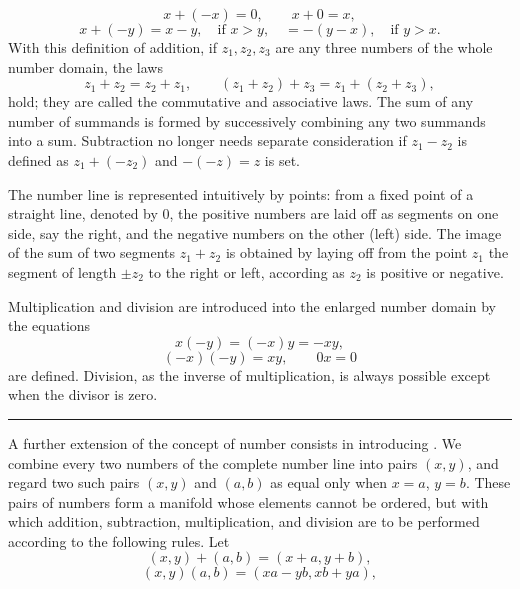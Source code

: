 \[
 x+(-x)=0,
 \qquad x+0=x,
\]
\[
 x+(-y)=x-y,\quad \text{if }x>y,
 \quad =-(y-x),\quad \text{if }y>x.
\]
With this definition of addition, if $z_1,z_2,z_3$ are any three
numbers of the whole number domain, the laws
\[
 z_1+z_2=z_2+z_1,
 \qquad (z_1+z_2)+z_3=z_1+(z_2+z_3),
\]
hold; they are called the commutative and associative laws. The sum of
any number of summands is formed by successively combining any two
summands into a sum. Subtraction no longer needs separate
consideration if $z_1-z_2$ is defined as $z_1+(-z_2)$ and
$-(-z)=z$ is set.

The number line is represented intuitively by points: from a fixed
point of a straight line, denoted by $0$, the positive numbers are laid
off as segments on one side, say the right, and the negative numbers
on the other (left) side. The image of the sum of two segments
$z_1+z_2$ is obtained by laying off from the point $z_1$ the segment
of length $\pm z_2$ to the right or left, according as $z_2$ is
positive or negative.

Multiplication and division are introduced into the enlarged number
domain by the equations
\[
 x(-y)=(-x)y=-xy,
\]
\[
 (-x)(-y)=xy,
 \qquad 0x=0
\]
are defined. Division, as the inverse of multiplication, is always possible except
when the divisor is zero.

\begin{center}
\rule{0.18\linewidth}{0.4pt}
\end{center}

A further extension of the concept of number consists in introducing
. We combine every two numbers of the
complete number line into pairs $(x,y)$, and regard two such pairs
$(x,y)$ and $(a,b)$ as equal only when $x=a$, $y=b$. These pairs of
numbers form a manifold whose elements cannot be ordered, but with
which addition, subtraction, multiplication, and division are to be
performed according to the following rules. Let
\[
 (x,y)+(a,b)=(x+a,y+b),
\]
\[
 (x,y)(a,b)=(xa-yb,xb+ya),
\]
